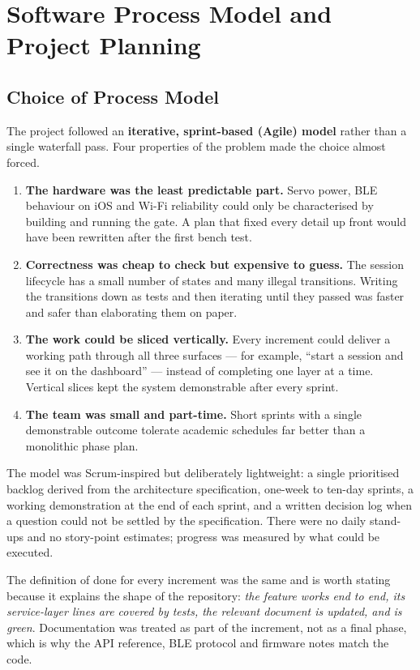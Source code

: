 \chapter{Software Process Model and Project Planning}

\section{Choice of Process Model}

The project followed an \textbf{iterative, sprint-based (Agile) model} rather than a
single waterfall pass. Four properties of the problem made the choice almost
forced.

\begin{enumerate}
  \item \textbf{The hardware was the least predictable part.} Servo power, BLE
        behaviour on iOS and Wi-Fi reliability could only be characterised by
        building and running the gate. A plan that fixed every detail up front
        would have been rewritten after the first bench test.
  \item \textbf{Correctness was cheap to check but expensive to guess.} The session
        lifecycle has a small number of states and many illegal transitions. Writing
        the transitions down as tests and then iterating until they passed was faster
        and safer than elaborating them on paper.
  \item \textbf{The work could be sliced vertically.} Every increment could deliver a
        working path through all three surfaces --- for example, ``start a session
        and see it on the dashboard'' --- instead of completing one layer at a time.
        Vertical slices kept the system demonstrable after every sprint.
  \item \textbf{The team was small and part-time.} Short sprints with a single
        demonstrable outcome tolerate academic schedules far better than a monolithic
        phase plan.
\end{enumerate}

The model was Scrum-inspired but deliberately lightweight: a single prioritised
backlog derived from the architecture specification, one-week to ten-day sprints, a
working demonstration at the end of each sprint, and a written decision log when a
question could not be settled by the specification. There were no daily stand-ups
and no story-point estimates; progress was measured by what could be executed.

The definition of done for every increment was the same and is worth stating because
it explains the shape of the repository: \emph{the feature works end to end, its
service-layer lines are covered by tests, the relevant document is updated, and
 is green}. Documentation was treated as part of the increment, not
as a final phase, which is why the API reference, BLE protocol and firmware notes
match the code.

